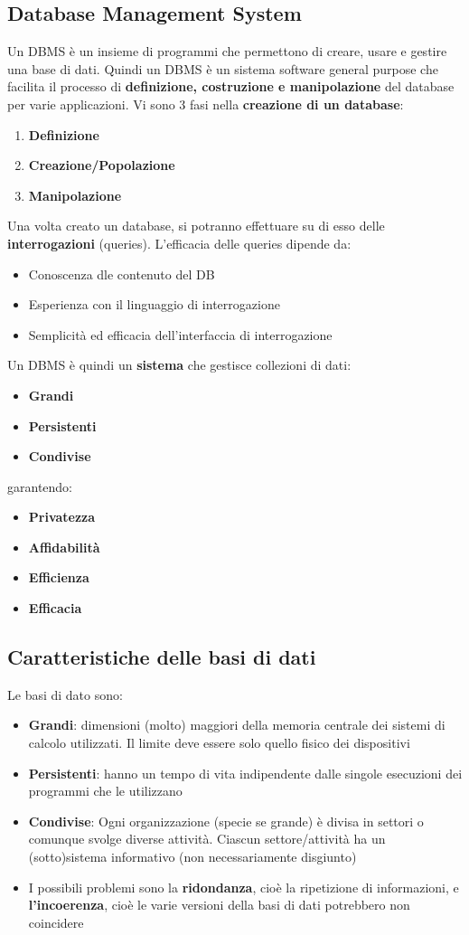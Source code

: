 \documentclass[12pt]{article}
\begin{document}
\subsection{Database Management System}
Un DBMS è un insieme di programmi che permettono di creare, usare e gestire una base di dati.
Quindi un DBMS è un sistema software general purpose che facilita il processo di \textbf{definizione, costruzione e manipolazione} del database per varie applicazioni.
Vi sono 3 fasi nella \textbf{creazione di un database}:
\begin{enumerate}
    \item \textbf{Definizione}
    \item \textbf{Creazione/Popolazione}
    \item \textbf{Manipolazione}
\end{enumerate}
Una volta creato un database, si potranno effettuare su di esso delle \textbf{interrogazioni} (queries).
L'efficacia delle queries dipende da:
\begin{itemize}
    \item Conoscenza dle contenuto del DB
    \item Esperienza con il linguaggio di interrogazione
    \item Semplicità ed efficacia dell'interfaccia di interrogazione
\end{itemize}
Un DBMS è quindi un \textbf{sistema} che gestisce collezioni di dati:
\begin{itemize}
    \item \textbf{Grandi}
    \item \textbf{Persistenti}
    \item \textbf{Condivise}
\end{itemize}
garantendo:
\begin{itemize}
    \item \textbf{Privatezza}
    \item \textbf{Affidabilità}
    \item \textbf{Efficienza}
    \item \textbf{Efficacia}
\end{itemize}
\subsection{Caratteristiche delle basi di dati}
Le basi di dato sono:
\begin{itemize}
    \item \textbf{Grandi}: dimensioni (molto) maggiori della memoria centrale dei sistemi di calcolo utilizzati. Il limite deve essere solo quello fisico dei dispositivi
    \item \textbf{Persistenti}: hanno un tempo di vita indipendente dalle singole esecuzioni dei programmi che le utilizzano
    \item \textbf{Condivise}: Ogni organizzazione (specie se grande) è divisa in settori o comunque svolge diverse attività. Ciascun settore/attività ha un (sotto)sistema informativo (non necessariamente disgiunto)
    \item I possibili problemi sono la \textbf{ridondanza}, cioè la ripetizione di informazioni, e \textbf{l'incoerenza}, cioè le varie versioni della basi di dati potrebbero non coincidere
\end{itemize}
\end{document}
